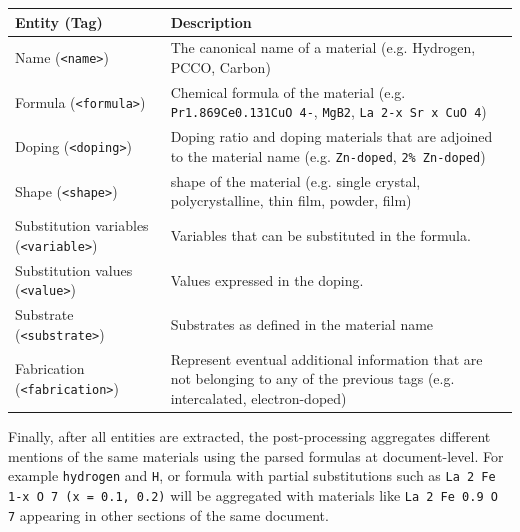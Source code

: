 \documentclass[]{interact}
\theoremstyle{plain}%
\theoremstyle{definition}
\theoremstyle{remark}
\begin{document}
\begin{table}[ht]
    {
        \begin{tabular}{m{16em} m{30em}}
            \toprule
            \textbf{Entity} (\textbf{Tag})               & \textbf{Description}                                                                                                              \\
            \midrule
            Name (\texttt{<name>})                       & The canonical name of a material (e.g. Hydrogen, PCCO, Carbon)                                                                    \\
            Formula (\texttt{<formula>})                 & Chemical formula of the material (e.g. \texttt{Pr1.869Ce0.131CuO 4-}, \texttt{MgB2}, \texttt{La 2-x Sr x CuO 4})                  \\
            Doping (\texttt{<doping>})                   & Doping ratio and doping materials that are adjoined to the material name (e.g. \texttt{Zn-doped}, \texttt{2\% Zn-doped})          \\
            Shape (\texttt{<shape>})                     & shape of the material (e.g. single crystal, polycrystalline, thin film, powder, film)                                             \\
            Substitution variables (\texttt{<variable>}) & Variables that can be substituted in the formula.                                                                                 \\
            Substitution values (\texttt{<value>})       & Values expressed in the doping.                                                                                                   \\
            Substrate (\texttt{<substrate>})             & Substrates as defined in the material name                                                                                        \\
            Fabrication (\texttt{<fabrication>})         & Represent eventual additional information that are not belonging to any of the previous tags  (e.g. intercalated, electron-doped) \\
            \bottomrule
        \end{tabular}
    }
    \label{tab:material-parser-entities}
\end{table}

Finally, after all entities are extracted, the post-processing aggregates different mentions of the same materials using the parsed formulas at document-level.
For example \texttt{hydrogen} and \texttt{H}, or formula with partial substitutions such as \texttt{La 2 Fe 1-x O 7 (x = 0.1, 0.2)} will be aggregated with materials like \texttt{La 2 Fe 0.9 O 7} appearing in other sections of the same document.
\end{document}
